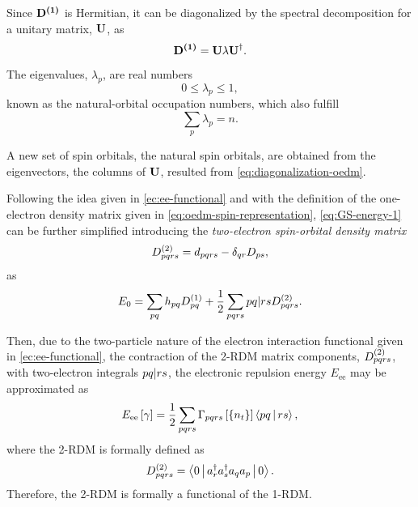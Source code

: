 Since $ \boldsymbol{\mathrm{D^{\left( 1 \right)}}}$ is Hermitian, it can be diagonalized by the spectral
decomposition for a unitary matrix, $ \boldsymbol{\mathrm{U}}$, as
\begin{equation} \label{eq:diagonalization-oedm}
    \boldsymbol{\mathrm{D^{\left( 1 \right)}}} =
    \boldsymbol{\mathrm{U}} \lambda \boldsymbol{\mathrm{U}}^{\dagger}
    .
\end{equation}

The eigenvalues, $\lambda_p$, are real numbers 
\begin{equation}
    0 \le \lambda_p \le 1
    ,
\end{equation}
known as the natural-orbital occupation numbers, which also fulfill 
\begin{equation}
    \sum_{p} \lambda_p = n
    .
\end{equation}

A new set of spin orbitals, the natural spin orbitals, are obtained from the
eigenvectors, the columns of $ \boldsymbol{\mathrm{U}}$, resulted from 
\cref{eq:diagonalization-oedm}.

Following the idea given in \cref{ec:ee-functional} and 
with the definition of the one-electron density matrix given in 
\cref{eq:oedm-spin-representation}, \cref{eq:GS-energy-1} can be further
simplified introducing the \textit{two-electron spin-orbital density matrix}
\begin{equation} \label{eq:tedm-spin-representation}
    D^{\left( 2 \right)}_{pqrs} = d_{pqrs} - \delta_{qr} D_{ps}
    ,
\end{equation}
as
\begin{equation} \label{eq:GS-energy-2}
    E_0 =
    \sum_{pq} h_{pq} \oedm_{pq} + \frac{1}{2} \sum_{pqrs}
    \PBraket{pq | rs} \tedm_{pqrs}
    .
\end{equation}

Then, due to the two-particle nature of the electron interaction functional
given in \cref{ec:ee-functional}, the contraction of the 2-RDM matrix components,
$D^{\left( 2 \right)}_{pqrs}$, with two-electron integrals $\PBraket{pq | rs}$, the
electronic repulsion energy $E_{\text{ee}}$ may be approximated as
\begin{equation} \label{eq:Eee_from_Gamma}
    E_{\text{ee}} \left[ \fordm \right]
    =
    \frac{1}{2} \sum_{pqrs}
    \sordm_{pqrs}\left[ \left\{ n_t \right\} \right] 
    \Braket{pq | rs}
    ,
\end{equation}
where the 2-RDM is formally defined as 
\begin{equation}
    \tedm_{pqrs} = \Braket{0 | a_r^{\dagger} a_s^{\dagger} a_q a_p | 0}
    .
\end{equation}
Therefore, the 2-RDM is formally a functional of the 1-RDM. %

